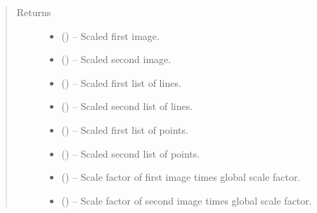 \documentclass[letterpaper,10pt,english]{sphinxmanual}
\begin{document}
\begin{fulllineitems}
\begin{quote}
\begin{description}
\item[{Returns}] \leavevmode
\begin{itemize}
\item {} 
 () -- Scaled first image.

\item {} 
 () -- Scaled second image.

\item {} 
 () -- Scaled first list of lines.

\item {} 
 () -- Scaled second list of lines.

\item {} 
 () -- Scaled first list of points.

\item {} 
 () -- Scaled second list of points.

\item {} 
 () -- Scale factor of first image times global scale factor.

\item {} 
 () -- Scale factor of second image times global scale factor.

\end{itemize}


\end{description}\end{quote}

\end{fulllineitems}

\end{document}
